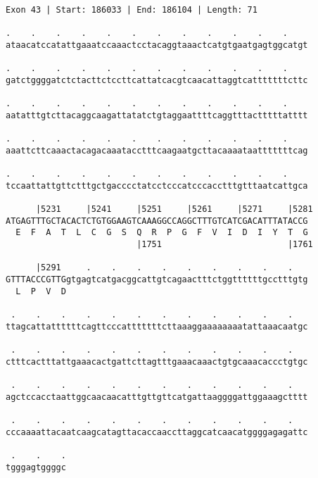 \documentclass{article}
\begin{document}
\newpage
\begin{Verbatim}
Exon 43 | Start: 186033 | End: 186104 | Length: 71
 
.    .    .    .    .    .    .    .    .    .    .    .    
ataacatccatattgaaatccaaactcctacaggtaaactcatgtgaatgagtggcatgt
  
.    .    .    .    .    .    .    .    .    .    .    .    
gatctggggatctctacttctccttcattatcacgtcaacattaggtcatttttttcttc
  
.    .    .    .    .    .    .    .    .    .    .    .    
aatatttgtcttacaggcaagattatatctgtaggaattttcaggtttactttttatttt
  
.    .    .    .    .    .    .    .    .    .    .    .    
aaattcttcaaactacagacaaatacctttcaagaatgcttacaaaataatttttttcag
  
.    .    .    .    .    .    .    .    .    .    .    .    
tccaattattgttctttgctgacccctatcctcccatcccacctttgtttaatcattgca
  
      |5231     |5241     |5251     |5261     |5271     |5281
ATGAGTTTGCTACACTCTGTGGAAGTCAAAGGCCAGGCTTTGTCATCGACATTTATACCG
  E  F  A  T  L  C  G  S  Q  R  P  G  F  V  I  D  I  Y  T  G
                          |1751                         |1761
  
      |5291     .    .    .    .    .    .    .    .    .   
GTTTACCCGTTGgtgagtcatgacggcattgtcagaactttctggttttttgcctttgtg
  L  P  V  D                                                
  
 .    .    .    .    .    .    .    .    .    .    .    .   
ttagcattattttttcagttcccatttttttcttaaaggaaaaaaaatattaaacaatgc
  
 .    .    .    .    .    .    .    .    .    .    .    .   
ctttcactttattgaaacactgattcttagtttgaaacaaactgtgcaaacaccctgtgc
  
 .    .    .    .    .    .    .    .    .    .    .    .   
agctccacctaattggcaacaacatttgttgttcatgattaaggggattggaaagctttt
  
 .    .    .    .    .    .    .    .    .    .    .    .   
cccaaaattacaatcaagcatagttacaccaaccttaggcatcaacatggggagagattc
  
 .    .    .
tgggagtggggc
\end{Verbatim}
\newpage
\end{document}
